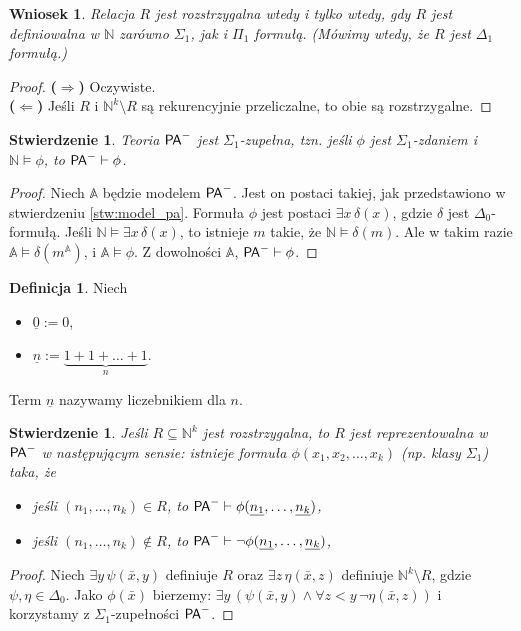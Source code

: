 \documentclass{article}
\newcommand{\N}{\mathbb{N}}
\newcommand{\A}{\mathbb{A}}
\theoremstyle{plain}
\newtheorem{stw}[thm]{Stwierdzenie}
\newtheorem{wn}[thm]{Wniosek}
\theoremstyle{definition}
\newtheorem{df}[thm]{Definicja}
\theoremstyle{remark}
\newcommand{\PA}{\mathsf{P \mkern-1.9mu A}}
\begin{document}
\begin{wn}
	Relacja $R$ jest rozstrzygalna wtedy i tylko wtedy, gdy $R$ jest
	definiowalna w $\N$ zarówno $\Sigma_1$, jak i $\Pi_1$ formułą.
	(Mówimy wtedy, że $R$ jest $\Delta_1$ formułą.)
\end{wn}
\begin{proof}
	\textbf{($\Rightarrow$)} Oczywiste.
	\\\textbf{($\Leftarrow$)} Jeśli $R$ i $\N^k \setminus R$ są
	rekurencyjnie przeliczalne, to obie są rozstrzygalne.
\end{proof}

\begin{stw}
	Teoria $\PA^-$ jest $\Sigma_1$-zupełna, tzn. jeśli $\phi$ jest
	$\Sigma_1$-zdaniem i $\N \models \phi$, to $\PA^- \vdash \phi$.
\end{stw}
\begin{proof}
	Niech $\mathbb{A}$ będzie modelem $\PA^-$.
	Jest on postaci takiej, jak przedstawiono w stwierdzeniu
	\ref{stw:model_pa}.
	Formuła $\phi$ jest postaci $\exists x \, \delta(x)$, gdzie $\delta$
	jest $\Delta_0$-formułą.
	Jeśli $\N \models \exists x \, \delta(x)$, to istnieje $m$ takie, że
	$\N \models \delta(m)$.
	Ale w takim razie $\A \models \delta(m^{\mathbb{A}})$,
	i $\A \models \phi$. Z dowolności $\mathbb{A}$, $\PA^- \vdash \phi$.
\end{proof}

\begin{df}
	 Niech
	 \begin{itemize}
		 \item $\underline{0} := 0$,
		 \item $\underline{n} := \underbrace{1+1+ \ldots +1}_{n}$.
	 \end{itemize}
	 Term $\underline{n}$ nazywamy liczebnikiem dla $n$.
\end{df}

\begin{stw}
	 Jeśli $R \subseteq \N^k$ jest rozstrzygalna, to $R$ jest
	 reprezentowalna w $\PA^-$ w następującym sensie: istnieje formuła
	 $\phi(x_1, x_2, \ldots, x_k)$ (np. klasy $\Sigma_1$) taka, że
	 \begin{itemize}
		 \item jeśli $(n_1, \ldots, n_k) \in R$, to $\PA^- \vdash
			 \phi(\underline{n_1}, \ldots, \underline{n_k})$,
		 \item jeśli $(n_1, \ldots, n_k) \not\in R$, to $\PA^- \vdash
			 \neg\phi(\underline{n_1}, \ldots, \underline{n_k})$,
	 \end{itemize}
\end{stw}
\begin{proof}
	Niech $\exists y \, \psi(\bar{x} , y)$ definiuje $R$ oraz $\exists z \,
	\eta(\bar{x} , z)$ definiuje $\N^k \setminus R$, gdzie $\psi, \eta \in
	\Delta_0$.
	Jako $\phi(\bar{x})$ bierzemy: $\exists y \, (\psi(\bar{x}, y) \wedge
	\forall z<y \, \neg \eta(\bar{x} , z))$ i korzystamy z
	$\Sigma_1$-zupełności $\PA^-$.
\end{proof}
\end{document}
